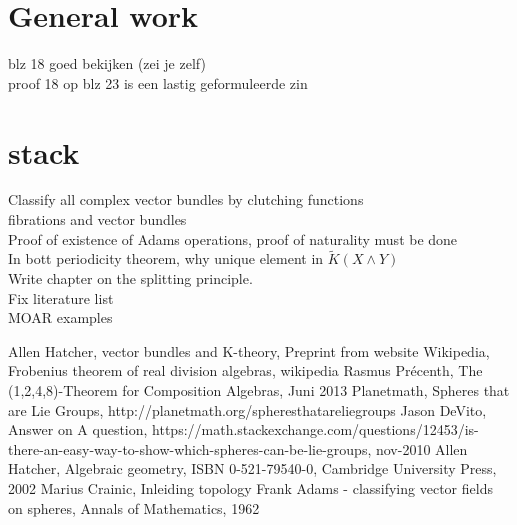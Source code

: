 \documentclass{report}
\begin{document}
\section{General work}
blz 18 goed bekijken (zei je zelf)
\\proof 18 op blz 23 is een lastig geformuleerde zin

\section{stack}
Classify all complex vector bundles by clutching functions
\\fibrations and vector bundles
\\Proof of existence of Adams operations, proof of naturality must be done
\\In bott periodicity theorem, why unique element in $\tilde{K}(X \wedge Y)$
\\Write chapter on the splitting principle.
\\Fix literature list
\\MOAR examples
\fi
\begin{thebibliography}{8}
Allen Hatcher, vector bundles and K-theory, Preprint from website
Wikipedia, Frobenius theorem of real division algebras, wikipedia
Rasmus Pr\'ecenth, The (1,2,4,8)-Theorem for Composition Algebras, Juni 2013
Planetmath, Spheres that are Lie Groups,
http://planetmath.org/spheresthatareliegroups
Jason DeVito, Answer on A question, https://math.stackexchange.com/questions/12453/is-there-an-easy-way-to-show-which-spheres-can-be-lie-groups,  nov-2010
Allen Hatcher, Algebraic geometry, ISBN 0-521-79540-0, Cambridge University Press, 2002
Marius Crainic, Inleiding topology
Frank Adams - classifying vector fields on spheres, Annals of Mathematics, 1962
\end{thebibliography}
\end{document}
